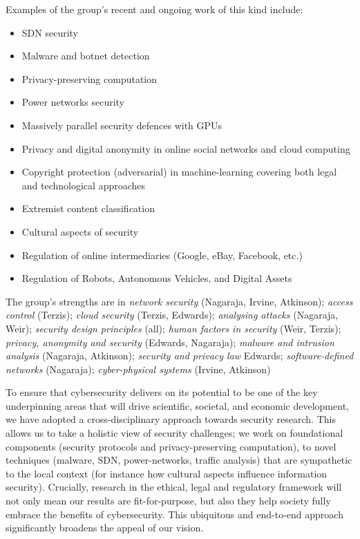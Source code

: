 \documentclass[11pt]{article}
\begin{document}
    
    Examples of the group's recent and ongoing work of
    this kind include:
    \begin{itemize}
    \item SDN security
    \item Malware and botnet detection
    \item Privacy-preserving computation
    \item Power networks security
    \item Massively parallel security defences with GPUs
    \item Privacy and digital anonymity in online social networks and cloud computing
    \item Copyright protection (adversarial) in machine-learning covering both legal and technological approaches
    \item Extremist content classification
    \item Cultural aspects of security
    \item Regulation of online intermediaries (Google, eBay, Facebook, etc.)
    \item Regulation of Robots, Autonomous Vehicles, and Digital Assets
    \end{itemize}

    
    The group's strengths are in
    \emph{network security} (Nagaraja, Irvine, Atkinson);
    \emph{access control} (Terzis);
    \emph{cloud security} (Terzis, Edwards);
    \emph{analysing attacks} (Nagaraja, Weir);
    \emph{security design principles} (all);
    \emph{human factors in security} (Weir, Terzis);
    \emph{privacy, anonymity and security} (Edwards, Nagaraja);
    \emph{malware and intrusion analysis} (Nagaraja, Atkinson);
    \emph{security and privacy law} {Edwards};
    \emph{software-defined networks} (Nagaraja); 
    \emph{cyber-physical systems} (Irvine, Atkinson)

    
    To ensure that cybersecurity delivers on its potential to be one
    of the key underpinning areas that will drive scientific,
    societal, and economic development, we have adopted a
    cross-disciplinary approach towards security research. This allows
    us to take a holistic view of security challenges; we work on
    foundational components (security protocols and privacy-preserving
    computation), to novel techniques (malware, SDN, power-networks, traffic analysis) that are sympathetic to the local context
    (for instance how cultural aspects influence information
    security). Crucially, research in the ethical, legal and
    regulatory framework will not only mean our results are
    fit-for-purpose, but also they help society fully embrace the
    benefits of cybersecurity. This ubiquitous and end-to-end approach
    significantly broadens the appeal of our vision.
\end{document}
